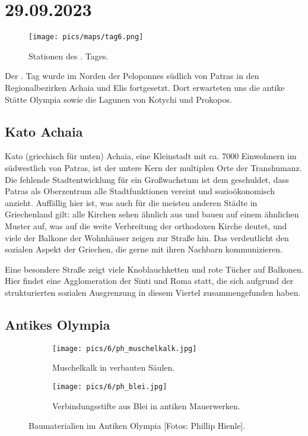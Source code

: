 \documentclass[preprint]{geomorphica} %
\begin{document}

\newpage

\section{29.09.2023}

\begin{figure}[!h]
    \centering
    \texttt{[image: pics/maps/tag6.png]}
    \caption{Stationen des \theday. Tages.}
    \label{pic:tag6}
\end{figure}

Der \theday. Tag wurde im Norden der Peloponnes südlich von Patras in den Regionalbezirken Achaia und Elis fortgesetzt. Dort erwarteten uns die antike Stätte Olympia sowie die Lagunen von Kotychi und Prokopos.

\subsection{Kato Achaia}

Kato (griechisch für unten) Achaia, eine Kleinstadt mit ca. 7000 Einwohnern im südwestlich von Patras, ist der untere Kern der multiplen Orte der Transhumanz. Die fehlende Stadtentwicklung für ein Großwachstum ist dem geschuldet, dass Patras als Oberzentrum alle Stadtfunktionen vereint und sozioökonomisch anzieht. Auffällig hier ist, was auch für die meisten anderen Städte in Griechenland gilt: alle Kirchen sehen ähnlich aus und bauen auf einem ähnlichen Muster auf, was auf die weite Verbreitung der orthodoxen Kirche deutet, und viele der Balkone der Wohnhäuser zeigen zur Straße hin. Das verdeutlicht den sozialen Aspekt der Griechen, die gerne mit ihren Nachbarn kommunizieren.

Eine besondere Straße zeigt viele Knoblauchketten und rote Tücher auf Balkonen. Hier findet eine Agglomeration der Sinti und Roma statt, die sich aufgrund der strukturierten sozialen Ausgrenzung in diesem Viertel zusammengefunden haben.

\subsection{Antikes Olympia}
\label{sec:olympia}

\begin{figure}[h]
    \begin{subfigure}{0.5\textwidth}
        \centering
        \texttt{[image: pics/6/ph\_muschelkalk.jpg]} 
        \caption{Muschelkalk in verbauten Säulen.}
        \label{pic:muschelkalk}
    \end{subfigure}
    \begin{subfigure}{0.5\textwidth}
        \centering
        \texttt{[image: pics/6/ph\_blei.jpg]}
        \caption{Verbindungsstifte aus Blei in antiken Mauerwerken.}
        \label{pic:blei}
    \end{subfigure}
    \caption{Baumaterialien im Antiken Olympia [Fotos: Phillip Hienle].}
\end{figure}
\end{document}
